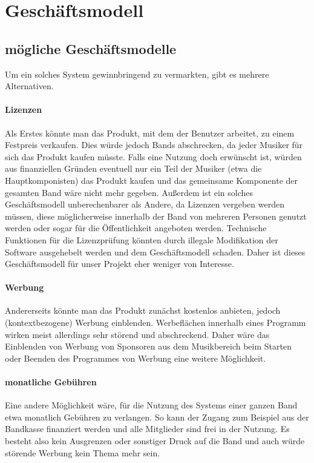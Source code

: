 \documentclass[12pt]{scrartcl}
\begin{document}

\section{Geschäftsmodell}


\subsection{mögliche Geschäftsmodelle}

Um ein solches System gewinnbringend zu vermarkten, gibt es mehrere Alternativen.

\paragraph{Lizenzen}
Als Erstes könnte man das Produkt, mit dem der Benutzer arbeitet, zu einem Festpreis verkaufen. Dies würde jedoch Bands abschrecken, da jeder Musiker für sich das Produkt kaufen müsste. Falls eine Nutzung doch erwünscht ist, würden aus finanziellen Gründen eventuell nur ein Teil der Musiker (etwa die Hauptkomponisten) das Produkt kaufen und das gemeinsame Komponente der gesamten Band wäre nicht mehr gegeben. Außerdem ist ein solches Geschäftsmodell unberechenbarer als Andere, da Lizenzen vergeben werden müssen, diese möglicherweise innerhalb der Band von mehreren Personen genutzt werden oder sogar für die Öffentlichkeit angeboten werden. Technische Funktionen für die Lizenzprüfung könnten durch illegale Modifikation der Software ausgehebelt werden und dem Geschäftsmodell schaden. Daher ist dieses Geschäftsmodell für unser Projekt eher weniger von Interesse.

\paragraph{Werbung}
Andererseits könnte man das Produkt zunächst kostenlos anbieten, jedoch (kontextbezogene) Werbung einblenden. Werbeflächen innerhalb eines Programm wirken meist allerdings sehr störend und abschreckend. Daher wäre das Einblenden von Werbung von Sponsoren aus dem Musikbereich beim Starten oder Beenden des Programmes von Werbung eine weitere Möglichkeit.

\paragraph{monatliche Gebühren}
Eine andere Möglichkeit wäre, für die Nutzung des Systems einer ganzen Band etwa monatlich Gebühren zu verlangen. So kann der Zugang zum Beispiel aus der Bandkasse finanziert werden und alle Mitglieder sind frei in der Nutzung. Es besteht also kein Ausgrenzen oder sonstiger Druck auf die Band und auch würde  störende Werbung kein Thema mehr sein.
\end{document}
